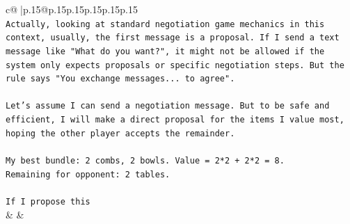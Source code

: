 \documentclass{article}
\begin{document}
{\begin{supertabular}{c@{$\;$}|p{.15\linewidth}@{}p{.15\linewidth}p{.15\linewidth}p{.15\linewidth}p{.15\linewidth}p{.15\linewidth}}
{{{\\ 
\texttt{Actually, looking at standard negotiation game mechanics in this context, usually, the first message is a proposal. If I send a text message like "What do you want?", it might not be allowed if the system only expects proposals or specific negotiation steps. But the rule says "You exchange messages... to agree".} \\
\\ 
\texttt{Let's assume I can send a negotiation message. But to be safe and efficient, I will make a direct proposal for the items I value most, hoping the other player accepts the remainder.} \\
\\ 
\texttt{My best bundle: 2 combs, 2 bowls. Value = 2*2 + 2*2 = 8.} \\
\texttt{Remaining for opponent: 2 tables.} \\
\\ 
\texttt{If I propose this} \\
            }
        }
    }
    & & \\ \\


\end{supertabular}}
\end{document}
